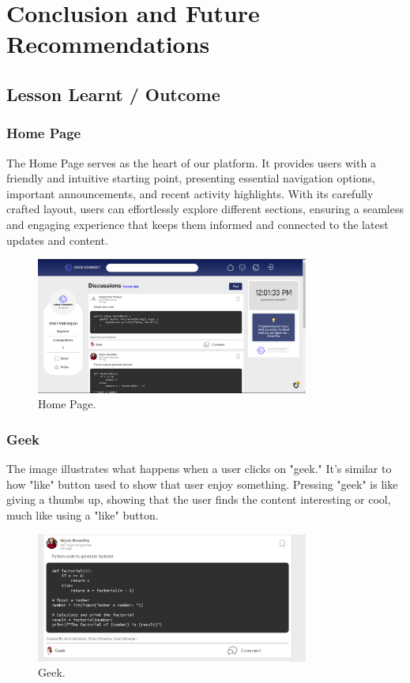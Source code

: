 \chapter{Conclusion and Future Recommendations}

\section{Lesson Learnt / Outcome}

\subsection{Home Page}
The Home Page serves as the heart of our platform. It provides users with a friendly and intuitive starting point, presenting essential navigation options, important announcements, and recent activity highlights. With its carefully crafted layout, users can effortlessly explore different sections, ensuring a seamless and engaging experience that keeps them informed and connected to the latest updates and content.
\begin{figure}[H]
    \centering
    \includegraphics[width=0.8\textwidth]{Outcome-ss/homepage.png}
    \caption{Home Page.}
    \label{fig:Home Page}
\end{figure}

\subsection{Geek}
The image illustrates what happens when a user clicks on "geek." It's similar to how "like" button used to show that user enjoy something. Pressing "geek" is like giving a thumbs up, showing that the user finds the content interesting or cool, much like using a "like" button.
\begin{figure}[H]
    \centering
    \includegraphics[width=0.8\textwidth]{Outcome-ss/geek.png}
    \caption{Geek.}
    \label{fig:Geek}
\end{figure}

